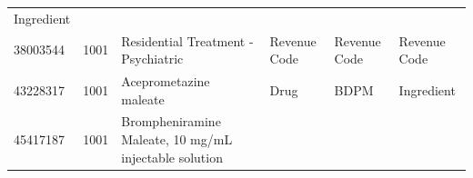 \documentclass[11pt]{book}
\theoremstyle{definition}
\theoremstyle{definition}
\theoremstyle{definition}
\theoremstyle{remark}
\begin{document}
\begin{longtable}[]{@{}llllll@{}}
\begin{minipage}[t]{0.14\columnwidth}
Ingredient\strut
\end{minipage}\tabularnewline
\begin{minipage}[t]{0.13\columnwidth}\raggedright\strut
38003544\strut
\end{minipage} & \begin{minipage}[t]{0.07\columnwidth}\raggedright\strut
1001\strut
\end{minipage} & \begin{minipage}[t]{0.16\columnwidth}\raggedright\strut
Residential Treatment - Psychiatric\strut
\end{minipage} & \begin{minipage}[t]{0.14\columnwidth}\raggedright\strut
Revenue Code\strut
\end{minipage} & \begin{minipage}[t]{0.14\columnwidth}\raggedright\strut
Revenue Code\strut
\end{minipage} & \begin{minipage}[t]{0.14\columnwidth}\raggedright\strut
Revenue Code\strut
\end{minipage}\tabularnewline
\begin{minipage}[t]{0.13\columnwidth}\raggedright\strut
43228317\strut
\end{minipage} & \begin{minipage}[t]{0.07\columnwidth}\raggedright\strut
1001\strut
\end{minipage} & \begin{minipage}[t]{0.16\columnwidth}\raggedright\strut
Aceprometazine maleate\strut
\end{minipage} & \begin{minipage}[t]{0.14\columnwidth}\raggedright\strut
Drug\strut
\end{minipage} & \begin{minipage}[t]{0.14\columnwidth}\raggedright\strut
BDPM\strut
\end{minipage} & \begin{minipage}[t]{0.14\columnwidth}\raggedright\strut
Ingredient\strut
\end{minipage}\tabularnewline
\begin{minipage}[t]{0.13\columnwidth}\raggedright\strut
45417187\strut
\end{minipage} & \begin{minipage}[t]{0.07\columnwidth}\raggedright\strut
1001\strut
\end{minipage} & \begin{minipage}[t]{0.16\columnwidth}\raggedright\strut
Brompheniramine Maleate, 10 mg/mL injectable solution\strut

\end{minipage}
\end{longtable}
\end{document}
